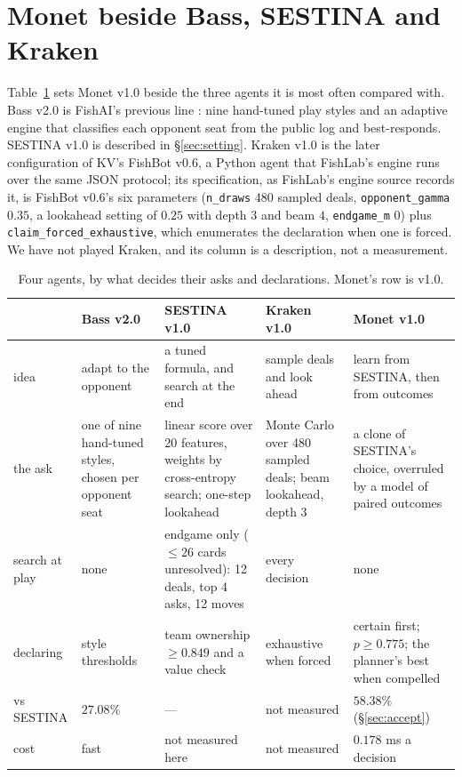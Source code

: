 \documentclass[11pt]{article}
\newcommand{\code}[1]{\texttt{#1}}
\newcommand{\sect}[1]{\S#1}
\newcommand{\VSestMeanPct}{$58.38\%$}
\begin{document}
\section{Monet beside Bass, SESTINA and Kraken}
\label{sec:compare}

Table~\ref{tab:compare} sets Monet v1.0 beside the three agents it is most often compared with.
Bass v2.0 is FishAI's previous line \cite{v20}: nine hand-tuned play styles and an adaptive engine that
classifies each opponent seat from the public log and best-responds. SESTINA v1.0 is described in
\sect\ref{sec:setting}. Kraken v1.0 is the later configuration of KV's FishBot v0.6, a Python agent
that FishLab's engine runs over the same JSON protocol; its specification, as FishLab's engine source
records it, is FishBot v0.6's six parameters (\code{n\_draws} $480$ sampled deals,
\code{opponent\_gamma} $0.35$, a lookahead setting of $0.25$ with depth $3$ and beam $4$,
\code{endgame\_m} $0$) plus \code{claim\_forced\_exhaustive}, which enumerates the declaration when
one is forced. We have not played Kraken, and its column is a
description, not a measurement.

\begin{table}[t]
\centering
\small
\caption{Four agents, by what decides their asks and declarations. Monet's row is v1.0.}
\label{tab:compare}
\begin{tabularx}{\linewidth}{@{}l>{\raggedright\arraybackslash}X>{\raggedright\arraybackslash}X>{\raggedright\arraybackslash}X>{\raggedright\arraybackslash}X@{}}
\toprule
 & Bass v2.0 & SESTINA v1.0 & Kraken v1.0 & Monet v1.0 \\
\midrule
idea & adapt to the opponent & a tuned formula, and search at the end & sample deals and look ahead & learn from SESTINA, then from outcomes \\
the ask & one of nine hand-tuned styles, chosen per opponent seat & linear score over 20 features, weights by cross-entropy search; one-step lookahead & Monte Carlo over 480 sampled deals; beam lookahead, depth 3 & a clone of SESTINA's choice, overruled by a model of paired outcomes \\
search at play & none & endgame only ($\le 26$ cards unresolved): 12 deals, top 4 asks, 12 moves & every decision & none \\
declaring & style thresholds & team ownership $\ge 0.849$ and a value check & exhaustive when forced & certain first; $p \ge 0.775$; the planner's best when compelled \\
vs SESTINA & $27.08\%$ & --- & not measured & \VSestMeanPct{} (\sect\ref{sec:accept}) \\
cost & fast & not measured here & not measured & $0.178$ ms a decision \\
\bottomrule
\end{tabularx}
\end{table}
\end{document}
